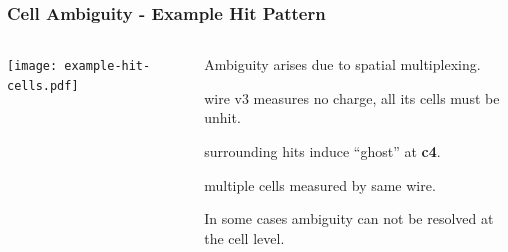 \documentclass[xcolor=dvipsnames]{beamer}
\begin{document}
\begin{frame}
  \frametitle{Cell Ambiguity - Example Hit Pattern}

  \begin{columns}
    \begin{column}{0.5\textwidth}
      \texttt{[image: example-hit-cells.pdf]}
    \end{column}
    \begin{column}{0.5\textwidth}
      Ambiguity arises due to spatial multiplexing.
      \begin{description}\scriptsize
      \item[Good] wire v3 measures no charge, all its cells must be unhit.
      \item[Bad] surrounding hits induce ``ghost'' at \textbf{c4}.
      \item[Ambiguous] multiple cells measured by same wire.
      \end{description}
      In some cases ambiguity can not be resolved at the cell level.
    \end{column}
  \end{columns}
\end{frame}
\end{document}
